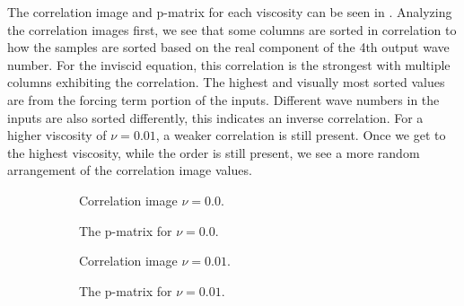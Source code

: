 The correlation image and p-matrix for each viscosity can be seen in . Analyzing the correlation images first, we see that some columns are sorted in correlation to how the samples are sorted based on the real component of the 4th output wave number. For the inviscid equation, this correlation is the strongest with multiple columns exhibiting the correlation. The highest and visually most sorted values are from the forcing term portion of the inputs. Different wave numbers in the inputs are also sorted differently, this indicates an inverse correlation. For a higher viscosity of \(\nu=0.01\), a weaker correlation is still present. Once we get to the highest viscosity, while the order is still present, we see a more random arrangement of the correlation image values.

\begin{figure}[H]
  \centering
  \begin{subfigure}{0.49\linewidth}
    \begin{adjustbox}{width=\linewidth}
      
    \end{adjustbox}
    \caption{Correlation image \(\nu=0.0\).}\label{fig:sc2_ci_0.0}
  \end{subfigure}
  \begin{subfigure}{0.49\linewidth}
    \begin{adjustbox}{width=\linewidth}
      
    \end{adjustbox}
    \caption{The p-matrix for \(\nu=0.0\).}\label{fig:sc2_pm_0.0}
  \end{subfigure}
  \begin{subfigure}{0.49\linewidth}
    \begin{adjustbox}{width=\linewidth}
      
    \end{adjustbox}
    \caption{Correlation image \(\nu=0.01\).}\label{fig:sc2_ci_0.01}
  \end{subfigure}
  \begin{subfigure}{0.49\linewidth}
    \begin{adjustbox}{width=\linewidth}
      
    \end{adjustbox}
    \caption{The p-matrix for \(\nu=0.01\).}\label{fig:sc2_pm_0.01}
  \end{subfigure}
  \begin{subfigure}{0.49\linewidth}

\end{subfigure}
\end{figure}
